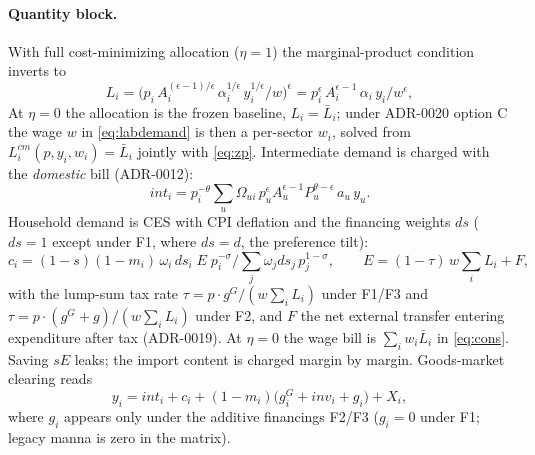 \paragraph{Quantity block.} With full cost-minimizing allocation
($\eta = 1$) the marginal-product condition inverts to
\begin{equation}
L_i = \big( p_i\, A_i^{(\epsilon-1)/\epsilon}\, \alpha_i^{1/\epsilon}\,
      y_i^{1/\epsilon} / w \big)^{\epsilon}
    = p_i^{\epsilon}\, A_i^{\epsilon-1}\, \alpha_i\, y_i / w^{\epsilon},
\label{eq:labdemand}
\end{equation}
At $\eta = 0$ the allocation is the frozen baseline, $L_i = \bar{L}_i$;
under ADR-0020 option C the wage $w$ in
\eqref{eq:labdemand} is then a per-sector $w_i$, solved from
$L^{cm}_i(p, y_i, w_i) = \bar{L}_i$ jointly with \eqref{eq:zp}.
Intermediate demand is charged with the \emph{domestic}
bill (ADR-0012):
\begin{equation}
int_i = p_i^{-\theta} \sum_u \Omega_{ui}\,
        p_u^{\epsilon} A_u^{\epsilon-1} P_u^{\theta-\epsilon}\, a_u\, y_u.
\label{eq:int}
\end{equation}
Household demand is CES with CPI deflation and the financing weights
$ds$ ($ds = 1$ except under F1, where $ds = d$, the preference tilt):
\begin{equation}
c_i = (1-s)(1-m_i)\,\omega_i\, ds_i\; E\; p_i^{-\sigma} \Big/
      \textstyle\sum_j \omega_j ds_j\, p_j^{1-\sigma},
\qquad
E = (1-\tau)\, w \textstyle\sum_i L_i + F,
\label{eq:cons}
\end{equation}
with the lump-sum tax rate $\tau = p\!\cdot\! g^G / (w \sum_i L_i)$ under
F1/F3 and $\tau = p\!\cdot\!(g^G + g)/(w \sum_i L_i)$ under F2, and $F$ the
net external transfer entering expenditure after tax (ADR-0019).
At $\eta = 0$ the wage bill is
$\sum_i w_i \bar{L}_i$ in \eqref{eq:cons}. Saving
$sE$ leaks; the import content is charged margin by margin. Goods-market
clearing reads
\begin{equation}
y_i = int_i + c_i + (1-m_i)\big( g^G_i + inv_i + g_i \big) + X_i,
\label{eq:clearing}
\end{equation}
where $g_i$ appears only under the additive financings F2/F3
($g_i = 0$ under F1; legacy manna is zero in the matrix).

